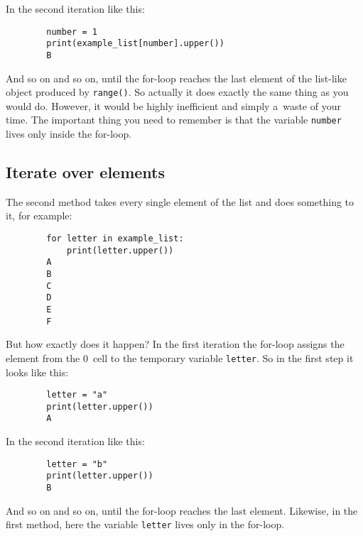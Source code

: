 \documentclass{article}
\begin{document}
\noindent In the second iteration like this:

\begin{center}
    \begin{verbatim}
        number = 1
        print(example_list[number].upper())
        B
    \end{verbatim}
\end{center}

\noindent And so on and so on, until the for-loop reaches the last element of the list-like object produced by \texttt{range()}. So actually it does exactly the same thing as you would do. However, it would be highly inefficient and simply a~waste of your time. The important thing you need to remember is that the variable \texttt{number} lives only inside the for-loop.

\subsection*{Iterate over elements}
The second method takes every single element of the list and does something to it, for example:
\begin{center}
    \begin{verbatim}
        for letter in example_list:
            print(letter.upper())
        A
        B
        C
        D
        E
        F
    \end{verbatim}
\end{center}
\noindent But how exactly does it happen? In the first iteration the for-loop assigns the element from the 0~cell to the temporary variable \texttt{letter}. So in the first step it looks like this:

\begin{center}
    \begin{verbatim}
        letter = "a"
        print(letter.upper())
        A
    \end{verbatim}
\end{center}
\noindent In the second iteration like this:
\begin{center}
    \begin{verbatim}
        letter = "b"
        print(letter.upper())
        B
    \end{verbatim}
\end{center}
\noindent And so on and so on, until the for-loop reaches the last element. Likewise, in the first method, here the variable \texttt{letter} lives only in the for-loop.
\end{document}

